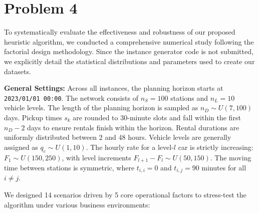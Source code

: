 \documentclass[10pt,a4paper]{article}
\begin{document}
\section*{Problem 4}
To systematically evaluate the effectiveness and robustness of our proposed heuristic algorithm, we conducted a comprehensive numerical study following the factorial design methodology. Since the instance generator code is not submitted, we explicitly detail the statistical distributions and parameters used to create our datasets.

\textbf{General Settings:} 
Across all instances, the planning horizon starts at \texttt{2023/01/01 00:00}. The network consists of $n_S=100$ stations and $n_L=10$ vehicle levels. The length of the planning horizon is sampled as $n_D \sim U(7, 100)$ days. Pickup times $s_k$ are rounded to 30-minute slots and fall within the first $n_D-2$ days to ensure rentals finish within the horizon. Rental durations are uniformly distributed between 2 and 48 hours. Vehicle levels are generally assigned as $q_c \sim U(1, 10)$. The hourly rate for a level-$l$ car is strictly increasing: $F_1 \sim U(150, 250)$, with level increments $F_{l+1}-F_l \sim U(50, 150)$. The moving time between stations is symmetric, where $t_{i,i}=0$ and $t_{i,j}=90$ minutes for all $i \neq j$.

We designed 14 scenarios driven by 5 core operational factors to stress-test the algorithm under various business environments:
\end{document}

